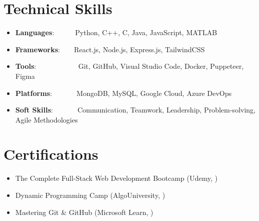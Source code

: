 \documentclass[a4paper,12pt]{article}
\newcommand{\resumeItem}[2]{
  \item{
    \textbf{#1}{:\hspace{0.5mm}#2 \vspace{-0.5mm}}
  }
}
\newcommand{\resumeSubItem}[2]{\resumeItem{#1}{#2}\vspace{-4pt}}
\newcommand{\resumeHeadingSkillStart}{\begin{itemize}[leftmargin=*,itemsep=1.7mm, rightmargin=2ex]}
\newcommand{\resumeItemListStart}{\begin{justify}\begin{itemize}[leftmargin=3ex, rightmargin=2ex, noitemsep,labelsep=1.2mm,itemsep=0mm]\small}
\newcommand{\resumeHeadingSkillEnd}{\end{itemize}\vspace{-2mm}}
\newcommand{\resumeItemListEnd}{\end{itemize}\end{justify}\vspace{-2mm}}
\begin{document}
\section{\textbf{Technical Skills}}
\resumeHeadingSkillStart

\resumeSubItem{Languages}{~~~~~~Python, C++, C, Java, JavaScript, MATLAB
}
\resumeSubItem{Frameworks}{~~~~React.js, Node.js, Express.js, TailwindCSS
}
\resumeSubItem{Tools}{~~~~~~~~~~~~Git, GitHub, Visual Studio Code, Docker, Puppeteer, Figma
}
\resumeSubItem{Platforms}{~~~~~~~MongoDB, MySQL, Google Cloud, Azure DevOps
}
\resumeSubItem{Soft Skills}{~~~~~~~Communication, Teamwork, Leadership, Problem-solving, Agile Methodologies
}

\resumeHeadingSkillEnd

\vspace{-1.5mm}

\vspace{-1mm}

\section{\textbf{Certifications}}
    \resumeItemListStart
\item The Complete Full-Stack Web Development Bootcamp (Udemy, )
\item Dynamic Programming Camp (AlgoUniversity, )
\item Mastering Git \& GitHub (Microsoft Learn, )
    \resumeItemListEnd
\vspace{-4mm}
\end{document}
